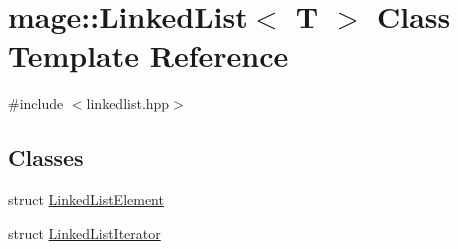 \hypertarget{classmage_1_1_linked_list}{}\section{mage\+:\+:Linked\+List$<$ T $>$ Class Template Reference}
\label{classmage_1_1_linked_list}


{\ttfamily \#include $<$linkedlist.\+hpp$>$}

\subsection*{Classes}
\begin{DoxyCompactItemize}
\item 
struct \hyperlink{structmage_1_1_linked_list_1_1_linked_list_element}{Linked\+List\+Element}
\item 
struct \hyperlink{structmage_1_1_linked_list_1_1_linked_list_iterator}{Linked\+List\+Iterator}
\end{DoxyCompactItemize}
